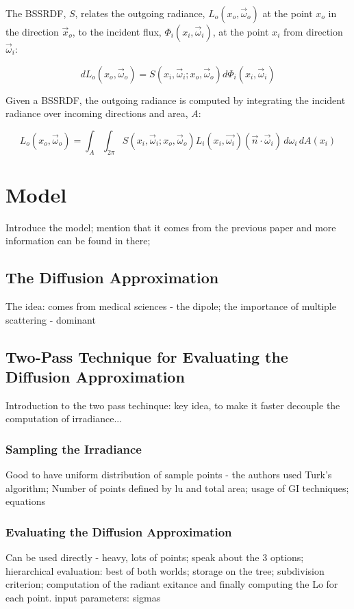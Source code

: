 \documentclass{article}
\begin{document}
The BSSRDF, $S$, relates the outgoing radiance, $L _o(x _o, \vec{\omega} _o)$ at the point $x _o$ in the direction $\vec{x} _o$, to the incident flux, $\Phi _i(x _i, \vec{\omega} _i)$, at the point $x _i$ from direction $\vec{\omega} _i$:

\begin{equation}
dL _o(x _o, \vec{\omega} _o) = S(x _i, \vec{\omega} _i; x _o, \vec{\omega} _o) d\Phi _i(x _i, \vec{\omega} _i)
\end{equation}

Given a BSSRDF, the outgoing radiance is computed by integrating the incident radiance over incoming directions and area, $A$:

\begin{equation}
L _o(x _o, \vec{\omega} _o) = 
\int_{A}\int _{2\pi} S(x _i, \vec{\omega} _i; x _o, \vec{\omega} _o) L_i(x_i, \vec{\omega_i})(\vec{n} \cdotp \vec{\omega}_i) \,d\omega_i \,dA(x_i)
\end{equation}

\section{Model}
Introduce the model; mention that it comes from the previous paper and more information can be found in there;

\subsection{The Diffusion Approximation}
The idea: comes from medical sciences - the dipole; the importance of multiple scattering - dominant
\subsection{Two-Pass Technique for Evaluating the Diffusion Approximation}
Introduction to the two pass techinque: key idea, to make it faster decouple the computation of irradiance...
\subsubsection{Sampling the Irradiance}
Good to have uniform distribution of sample points - the authors used Turk's algorithm; Number of points defined by lu and total area; usage of GI techniques;
equations
\subsubsection{Evaluating the Diffusion Approximation}
Can be used directly - heavy, lots of points; speak about the 3 options; hierarchical evaluation: best of both worlds; storage on the tree; subdivision criterion; computation of the radiant exitance and finally computing the Lo for each point.
input parameters: sigmas
\end{document}
